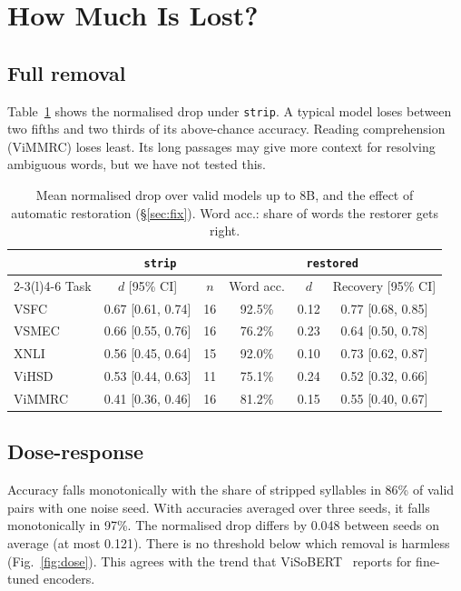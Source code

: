 \documentclass[conference]{IEEEtran}
\begin{document}
\section{How Much Is Lost?}\label{sec:effect}

\subsection{Full removal}
Table~\ref{tab:strip} shows the normalised drop under \texttt{strip}. A typical model loses between two fifths and two thirds of its above-chance accuracy. Reading comprehension (ViMMRC) loses least. Its long passages may give more context for resolving ambiguous words, but we have not tested this.

\begin{table}[t]
\centering
\caption{Mean normalised drop over valid models up to 8B, and the effect of automatic restoration (\S\ref{sec:fix}). Word acc.: share of words the restorer gets right.}
\label{tab:strip}
\setlength{\tabcolsep}{4pt}
\begin{tabular}{@{}lccccc@{}}
\toprule
& \multicolumn{2}{c}{\texttt{strip}} & \multicolumn{3}{c}{\texttt{restored}} \\
\cmidrule(lr){2-3}\cmidrule(l){4-6}
Task & $d$ [95\% CI] & $n$ & Word acc. & $d$ & Recovery [95\% CI] \\
\midrule
VSFC   & 0.67 [0.61, 0.74] & 16 & 92.5\% & 0.12 & 0.77 [0.68, 0.85] \\
VSMEC  & 0.66 [0.55, 0.76] & 16 & 76.2\% & 0.23 & 0.64 [0.50, 0.78] \\
XNLI   & 0.56 [0.45, 0.64] & 15 & 92.0\% & 0.10 & 0.73 [0.62, 0.87] \\
ViHSD  & 0.53 [0.44, 0.63] & 11 & 75.1\% & 0.24 & 0.52 [0.32, 0.66] \\
ViMMRC & 0.41 [0.36, 0.46] & 16 & 81.2\% & 0.15 & 0.55 [0.40, 0.67] \\
\bottomrule
\end{tabular}
\end{table}

\subsection{Dose-response}
Accuracy falls monotonically with the share of stripped syllables in 86\% of valid pairs with one noise seed. With accuracies averaged over three seeds, it falls monotonically in 97\%. The normalised drop differs by 0.048 between seeds on average (at most 0.121). There is no threshold below which removal is harmless (Fig.~\ref{fig:dose}). This agrees with the trend that ViSoBERT~\cite{nguyen2023visobert} reports for fine-tuned encoders.
\end{document}
